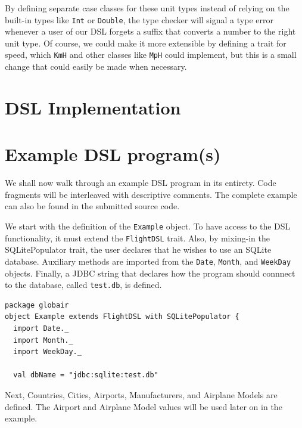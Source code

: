 \documentclass[a4paper]{article}
\newcommand{\cc}[1]{\texttt{#1}}
\begin{document}
By defining separate case classes for these unit types instead of relying on the built-in types like \cc{Int} or \cc{Double}, the type checker will signal a type error whenever a user of our DSL forgets a suffix that converts a number to the right unit type.
Of course, we could make it more extensible by defining a trait for speed, which \cc{KmH} and other classes like \cc{MpH} could implement, but this is a small change that could easily be made when necessary.


\section{DSL Implementation}
\label{sec:dsl-implementation}


\section{Example DSL program(s)}
\label{sec:example-dsl-programs}


We shall now walk through an example DSL program in its entirety.
Code fragments will be interleaved with descriptive comments.
The complete example can also be found in the submitted source code.


We start with the definition of the \cc{Example} object.
To have access to the DSL functionality, it must extend the \cc{FlightDSL} trait.
Also, by mixing-in the SQLitePopulator trait, the user declares that he wishes to use an SQLite database.
Auxiliary methods are imported from the \cc{Date}, \cc{Month}, and \cc{WeekDay} objects.
Finally, a JDBC string that declares how the program should connnect to the database, called \cc{test.db}, is defined.

\begin{lstlisting}
package globair
object Example extends FlightDSL with SQLitePopulator {
  import Date._
  import Month._
  import WeekDay._

  val dbName = "jdbc:sqlite:test.db"
\end{lstlisting}

Next, Countries, Cities, Airports, Manufacturers, and Airplane Models are defined.
The Airport and Airplane Model values will be used later on in the example.
\end{document}
